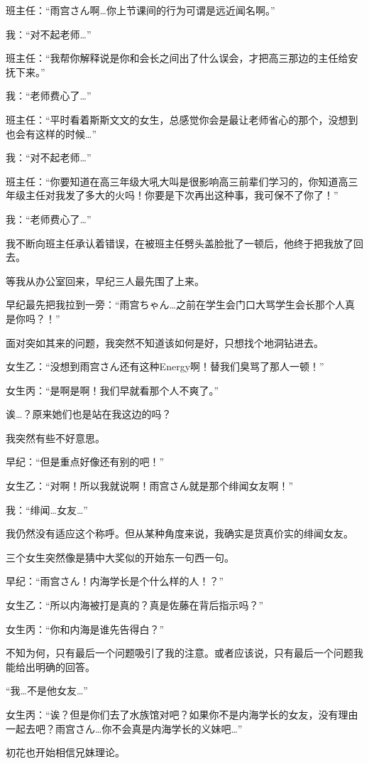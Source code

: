 班主任：“雨宫さん啊…你上节课间的行为可谓是远近闻名啊。”

我：“对不起老师…”

班主任：“我帮你解释说是你和会长之间出了什么误会，才把高三那边的主任给安抚下来。”

我：“老师费心了…”

班主任：“平时看着斯斯文文的女生，总感觉你会是最让老师省心的那个，没想到也会有这样的时候…”

我：“对不起老师…”

班主任：“你要知道在高三年级大吼大叫是很影响高三前辈们学习的，你知道高三年级主任对我发了多大的火吗！你要是下次再出这种事，我可保不了你了！”

我：“老师费心了…”

我不断向班主任承认着错误，在被班主任劈头盖脸批了一顿后，他终于把我放了回去。

等我从办公室回来，早纪三人最先围了上来。

早纪最先把我拉到一旁：“雨宫ちゃん…之前在学生会门口大骂学生会长那个人真是你吗？！”

面对突如其来的问题，我突然不知道该如何是好，只想找个地洞钻进去。

女生乙：“没想到雨宫さん还有这种Energy啊！替我们臭骂了那人一顿！”

女生丙：“是啊是啊！我们早就看那个人不爽了。”

诶…？原来她们也是站在我这边的吗？

我突然有些不好意思。

早纪：“但是重点好像还有别的吧！”

女生乙：“对啊！所以我就说啊！雨宫さん就是那个绯闻女友啊！”

我：“绯闻…女友…”

我仍然没有适应这个称呼。但从某种角度来说，我确实是货真价实的绯闻女友。

三个女生突然像是猜中大奖似的开始东一句西一句。

早纪：“雨宫さん！内海学长是个什么样的人！？”

女生乙：“所以内海被打是真的？真是佐藤在背后指示吗？”

女生丙：“你和内海是谁先告得白？”

不知为何，只有最后一个问题吸引了我的注意。或者应该说，只有最后一个问题我能给出明确的回答。

“我…不是他女友…”

女生丙：“诶？但是你们去了水族馆对吧？如果你不是内海学长的女友，没有理由一起去吧？雨宫さん…你不会真是内海学长的义妹吧…”

初花也开始相信兄妹理论。

